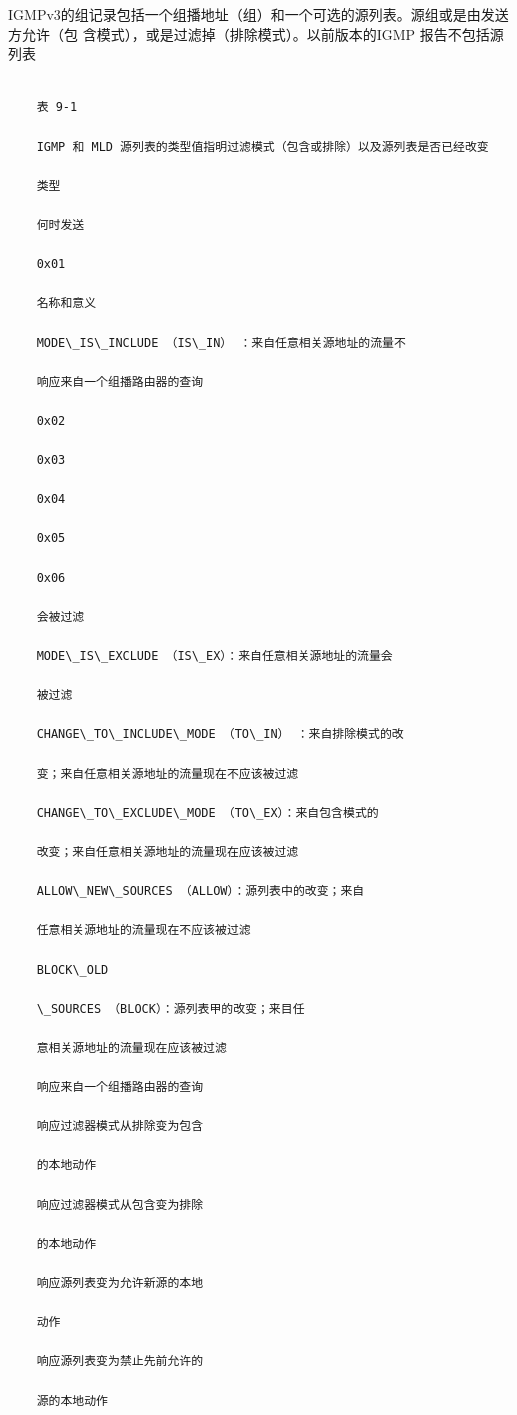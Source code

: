 IGMPv3的组记录包括一个组播地址（组）和一个可选的源列表。源组或是由发送方允许（包
含模式），或是过滤掉（排除模式）。以前版本的IGMP 报告不包括源列表
\begin{verbatim}
    
    表 9-1
    
    IGMP 和 MLD 源列表的类型值指明过滤模式（包含或排除）以及源列表是否已经改变
    
    类型
    
    何时发送
    
    0x01
    
    名称和意义
    
    MODE\_IS\_INCLUDE （IS\_IN） ：来自任意相关源地址的流量不
    
    响应来自一个组播路由器的查询
    
    0x02
    
    0x03
    
    0x04
    
    0x05
    
    0x06
    
    会被过滤
    
    MODE\_IS\_EXCLUDE （IS\_EX）：来自任意相关源地址的流量会
    
    被过滤
    
    CHANGE\_TO\_INCLUDE\_MODE （TO\_IN） ：来自排除模式的改
    
    变；来自任意相关源地址的流量现在不应该被过滤
    
    CHANGE\_TO\_EXCLUDE\_MODE （TO\_EX）：来自包含模式的
    
    改变；来自任意相关源地址的流量现在应该被过滤
    
    ALLOW\_NEW\_SOURCES （ALLOW）：源列表中的改变；来自
    
    任意相关源地址的流量现在不应该被过滤
    
    BLOCK\_OLD
    
    \_SOURCES （BLOCK）：源列表甲的改变；来目任
    
    意相关源地址的流量现在应该被过滤
    
    响应来自一个组播路由器的查询
    
    响应过滤器模式从排除变为包含
    
    的本地动作
    
    响应过滤器模式从包含变为排除
    
    的本地动作
    
    响应源列表变为允许新源的本地
    
    动作
    
    响应源列表变为禁止先前允许的
    
    源的本地动作
\end{verbatim}

